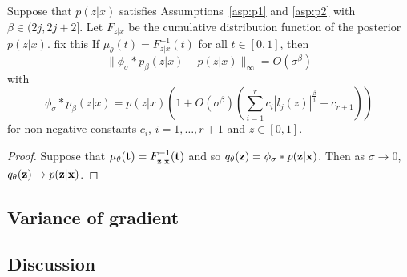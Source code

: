 \documentclass[10pt]{article}
\begin{document}
\begin{proposition}
Suppose that $p(z|x)$ satisfies Assumptions~\ref{asp:p1} and \ref{asp:p2} with $\beta\in(2j,2j+2]$. Let $F_{z|x}$ be the cumulative distribution function of the posterior $p(z|x)$. \todo fix this If $\mu_\theta(t)=F_{z|x}^{-1}(t)$ for all $t\in[0,1]$, then
\[
\|\phi_\sigma * p_\beta(z|x) - p(z|x)\|_\infty = O(\sigma^\beta)
\]
with
\[
\phi_\sigma * p_\beta(z|x) = p(z|x)\left(1+O(\sigma^\beta)\left(\sum_{i=1}^rc_i|l_j(z)|^{\frac{\beta}{i}}+c_{r+1}\right)\right)
\]
for non-negative constants $c_i$, $i=1,\ldots,r+1$ and $z\in[0,1]$.
\end{proposition}
\begin{proof}
Suppose that $\mu_\theta(\mathbf{t})=F_{\mathbf{z}|\mathbf{x}}^{-1}(\mathbf{t})$ and so $q_\theta(\mathbf{z})=\phi_\sigma*p(\mathbf{z}|\mathbf{x})$. Then as $\sigma\rightarrow0$, $q_\theta(\mathbf{z})\rightarrow p(\mathbf{z}|\mathbf{x})$.
\end{proof}


\subsection{Variance of gradient}

\subsection{Discussion}


\newpage




\end{document}
